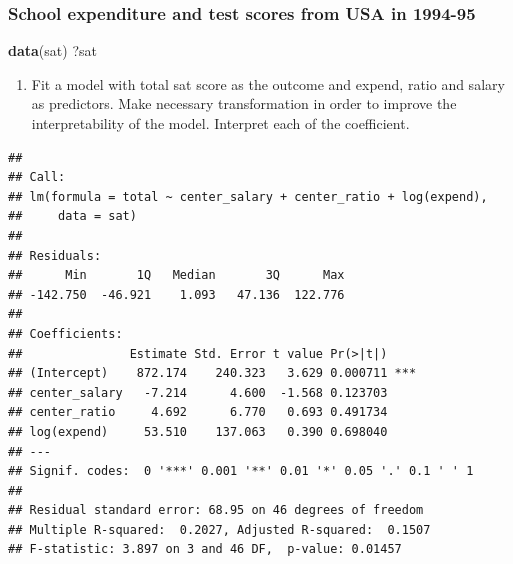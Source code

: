 \documentclass[]{article}
\newenvironment{Shaded}{\begin{snugshade}}{\end{snugshade}}
\newcommand{\KeywordTok}[1]{\textcolor[rgb]{0.13,0.29,0.53}{\textbf{#1}}}
\newcommand{\DataTypeTok}[1]{\textcolor[rgb]{0.13,0.29,0.53}{#1}}
\newcommand{\OperatorTok}[1]{\textcolor[rgb]{0.81,0.36,0.00}{\textbf{#1}}}
\newcommand{\NormalTok}[1]{#1}
\providecommand{\tightlist}{%
  \setlength{\itemsep}{0pt}\setlength{\parskip}{0pt}}
\begin{document}
\subsubsection{School expenditure and test scores from USA in
1994-95}\label{school-expenditure-and-test-scores-from-usa-in-1994-95}

\begin{Shaded}
\begin{Highlighting}[]
\KeywordTok{data}\NormalTok{(sat)}
\NormalTok{?sat}
\end{Highlighting}
\end{Shaded}

\begin{enumerate}
\def\labelenumi{\arabic{enumi}.}
\tightlist
\item
  Fit a model with total sat score as the outcome and expend, ratio and
  salary as predictors. Make necessary transformation in order to
  improve the interpretability of the model. Interpret each of the
  coefficient.
\end{enumerate}

\begin{Shaded}
\end{Shaded}

\begin{verbatim}
## 
## Call:
## lm(formula = total ~ center_salary + center_ratio + log(expend), 
##     data = sat)
## 
## Residuals:
##      Min       1Q   Median       3Q      Max 
## -142.750  -46.921    1.093   47.136  122.776 
## 
## Coefficients:
##               Estimate Std. Error t value Pr(>|t|)    
## (Intercept)    872.174    240.323   3.629 0.000711 ***
## center_salary   -7.214      4.600  -1.568 0.123703    
## center_ratio     4.692      6.770   0.693 0.491734    
## log(expend)     53.510    137.063   0.390 0.698040    
## ---
## Signif. codes:  0 '***' 0.001 '**' 0.01 '*' 0.05 '.' 0.1 ' ' 1
## 
## Residual standard error: 68.95 on 46 degrees of freedom
## Multiple R-squared:  0.2027, Adjusted R-squared:  0.1507 
## F-statistic: 3.897 on 3 and 46 DF,  p-value: 0.01457
\end{verbatim}
\end{document}
